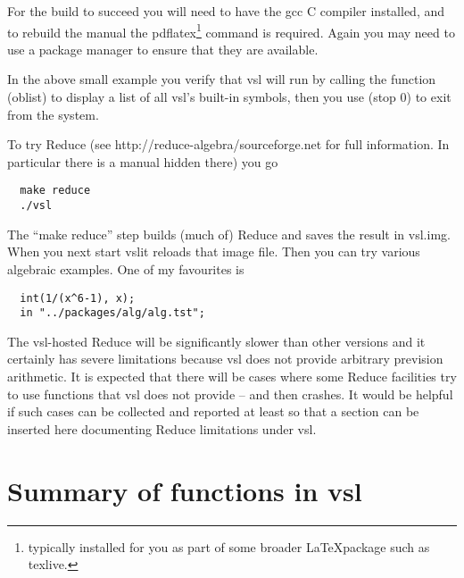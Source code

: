 \documentclass[a4paper,12pt]{article}
\newcommand{\vsl}{{\ttfamily vsl}}
\newcommand{\tx}{\ttfamily}
\begin{document}
For the build to succeed you will need to have the {\tx gcc} C compiler
installed, and to rebuild the manual the {\tx pdflatex}\footnote{typically
installed for you as part of some broader \LaTeX package such as texlive.}
command is required. Again you may need to use a package manager to ensure
that they are available.

In the above small example you verify that \vsl{} will run by calling the
function {\tx (oblist)} to display a list of all \vsl's built-in
symbols, then you use {\tx (stop 0)} to exit from the system.

To try Reduce (see {\tx http://reduce-algebra/sourceforge.net} for
full information. In particular there is a manual hidden there) you go
{\small\begin{verbatim}
  make reduce
  ./vsl
\end{verbatim}}

The ``{\tx make reduce}'' step builds (much of) Reduce and saves
the result in {\tx vsl.img}. When you next start \vsl it reloads that
image file. Then you can try various algebraic examples. One of my
favourites is
{\small\begin{verbatim}
  int(1/(x^6-1), x);
  in "../packages/alg/alg.tst";
\end{verbatim}}

The \vsl-hosted Reduce will be significantly slower than other versions
and it certainly has severe limitations because \vsl{} does not provide
arbitrary prevision arithmetic. It is expected that there will be cases
where some Reduce facilities try to use functions that \vsl{} does not
provide -- and then crashes. It would be helpful if such cases can be
collected and reported at least so that a section can be inserted here
documenting Reduce limitations under \vsl.


\section{Summary of functions in \vsl}




\end{document}
